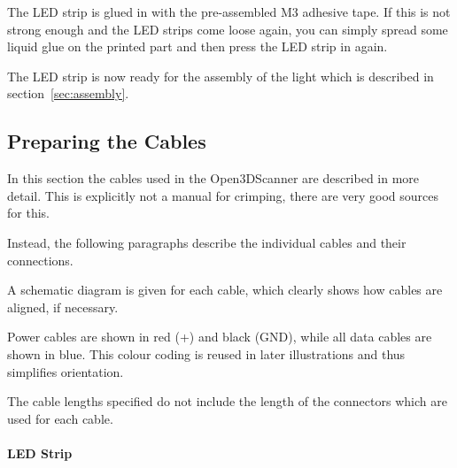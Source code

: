 The LED strip is glued in with the pre-assembled M3 adhesive tape. If this is not strong enough and the LED strips come loose again, you can simply spread some liquid glue on the printed part and then press the LED strip in again.

The LED strip is now ready for the assembly of the light which is described in section~\ref{sec:assembly}.

\subsection{Preparing the Cables}
In this section the cables used in the Open3DScanner are described in more detail. This is explicitly not a manual for crimping, there are very good sources for this.%

Instead, the following paragraphs describe the individual cables and their connections.%

A schematic diagram is given for each cable, which clearly shows how cables are aligned, if necessary.%

Power cables are shown in red (+) and black (GND), while all data cables are shown in blue. This colour coding is reused in later illustrations and thus simplifies orientation.%

The cable lengths specified do not include the length of the connectors which are used for each cable.%

\paragraph{LED Strip}\mbox{}\\%

%


